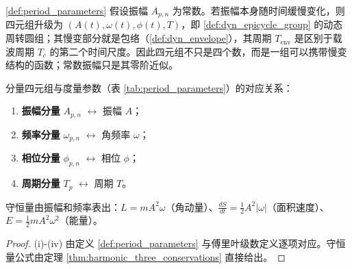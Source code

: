 \begin{remark}[振幅的时变性与包络]\label{rem:period_parameters_time_varying}
\cref{def:period_parameters} 假设振幅 $A_{p,n}$ 为常数。若振幅本身随时间缓慢变化，则四元组升级为 $(A(t),\omega(t),\phi(t),T)$，即 \cref{def:dyn_epicycle_group} 的动态周转圆组；其慢变部分就是包络（\cref{def:dyn_envelope}），其周期 $T_{\text{env}}$ 是区别于载波周期 $T_c$ 的第二个时间尺度。因此四元组不只是四个数，而是一组可以携带慢变结构的函数；常数振幅只是其零阶近似。
\end{remark}

\begin{property}[度量参数与分量的关系]\label{ch9_period_params_property}
分量四元组与度量参数（表 \ref{tab:period_parameters}）的对应关系：
\begin{enumerate}[label=(\roman*)]
    \item \textbf{振幅分量} $A_{p,n}$ $\leftrightarrow$ 振幅 $A$；
    \item \textbf{频率分量} $\omega_{p,n}$ $\leftrightarrow$ 角频率 $\omega$；
    \item \textbf{相位分量} $\phi_{p,n}$ $\leftrightarrow$ 相位 $\phi$；
    \item \textbf{周期分量} $T_p$ $\leftrightarrow$ 周期 $T$。
\end{enumerate}
守恒量由振幅和频率表出：$L = mA^2\omega$（角动量）、$\frac{dS}{dt} = \frac12 A^2|\omega|$（面积速度）、$E = \frac12 mA^2\omega^2$（能量）。
\end{property}

\begin{proof}
(i)-(iv) 由定义 \ref{def:period_parameters} 与傅里叶级数定义逐项对应。守恒量公式由定理 \ref{thm:harmonic_three_conservations} 直接给出。
\end{proof}

